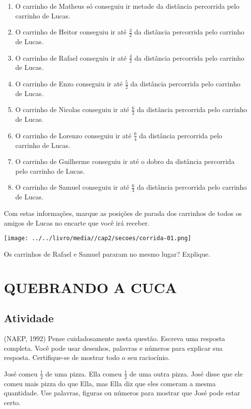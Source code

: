 \documentclass[a4,12pt]{book}
\begin{document}
\begin{enumerate} [\quad a)] %
  \item     O carrinho de Matheus só conseguiu ir metade da distância percorrida pelo carrinho de Lucas.
  \item     O carrinho de Heitor conseguiu ir até     $\frac{3}{2}$     da distância percorrida pelo carrinho de Lucas. 
  \item     O carrinho de Rafael conseguiu ir até     $\frac{4}{2}$     da distância percorrida pelo carrinho de Lucas.
  \item     O carrinho de Enzo conseguiu ir até     $\frac{5}{2}$     da distância percorrida pelo carrinho de Lucas. 
  \item     O carrinho de Nicolas conseguiu ir até     $\frac{6}{2}$     da distância percorrida pelo carrinho de Lucas. 
  \item     O carrinho de Lorenzo conseguiu ir até     $\frac{6}{4}$     da distância percorrida pelo carrinho de Lucas. 
  \item     O carrinho de Guilherme conseguiu ir até o dobro da distância percorrida pelo carrinho de Lucas.
  \item     O carrinho de Samuel conseguiu ir até     $\frac{6}{3}$     da distância percorrida pelo carrinho de Lucas. 
\end{enumerate} %


Com estas informações, marque as posições de parada dos carrinhos de todos os amigos de Lucas no encarte que você irá receber.

\texttt{[image: ../../livro/media//cap2/secoes/corrida-01.png]}

Os carrinhos de Rafael e Samuel pararam no mesmo lugar? Explique.

\section{QUEBRANDO A CUCA }

\subsection{Atividade}

(NAEP, 1992) Pense cuidadosamente nesta questão. Escreva uma resposta completa. Você pode usar desenhos, palavras e números para explicar sua resposta. Certifique-se de mostrar todo o seu raciocínio.

José comeu $\frac{1}{2}$ de uma pizza. Ella comeu $\frac{1}{2}$ de uma outra pizza. José disse que ele comeu mais pizza do que Ella, mas Ella diz que eles comeram a mesma quantidade. Use palavras, figuras ou números para mostrar que José pode estar certo.
\end{document}
